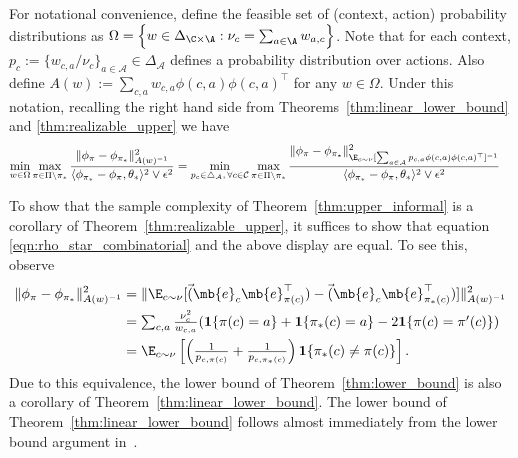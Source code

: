 \documentclass{article}
\newcommand{\mc}[1]{\mathcal{#1}}
\newcommand{\1}{\mathbf{1}}
\begin{document}
For notational convenience, define the feasible set of (context, action) probability distributions as $\Omega = \Big\{ w \in \Delta_{\C \times \A} : \nu_c = \sum_{a \in \A} w_{a,c}  \Big\}$. Note that for each context, $p_{c} := \{w_{c,a}/\nu_c\}_{a\in \mc{A}}\in \Delta_{\mc{A}}$ defines a probability distribution over actions. Also define $A(w) := \sum_{c,a} w_{c,a} \phi(c,a) \phi(c,a)^\top$ for any $w \in \Omega$. 
Under this notation, recalling the right hand side from Theorems~\ref{thm:linear_lower_bound} and \ref{thm:realizable_upper} we have
\begin{align*}
    \min_{w\in \Omega }\max_{\pi \in \Pi \setminus \pi_*} \frac{ \| \phi_\pi - \phi_{\pi_*} \|^2_{A(w)^{-1}} }{\langle \phi_{\pi_*}-\phi_\pi, \theta_*\rangle^2 \vee \epsilon^2} &= \min_{p_c  \in \triangle_{\mc{A}}, \, \forall c \in \mc{C}} \max_{\pi \in \Pi \setminus \pi_*} \frac{ \| \phi_\pi - \phi_{\pi_*} \|^2_{\E_{c \sim \nu}[ \sum_{a \in \mc{A}} p_{c,a} \phi(c,a) \phi(c,a)^{\top} ]^{-1}} }{ \langle \phi_{\pi_*} - \phi_\pi , \theta_* \rangle^2 \vee \epsilon^2 } \label{eqn:rho_star_linear}
\end{align*}

To show that the sample complexity of Theorem~\ref{thm:upper_informal} is a corollary of Theorem~\ref{thm:realizable_upper}, it suffices to show that equation \eqref{eqn:rho_star_combinatorial} and the above display are equal. %
To see this, observe
\begin{align*}
    \| \phi_\pi - \phi_{\pi_*} \|^2_{A(w)^{-1}} &= \| \E_{c\sim\nu}[ \vec(\mb{e}_c \mb{e}_{\pi(c)}^\top) - \vec(\mb{e}_c \mb{e}_{\pi_*(c)}^\top)  ] \|_{A(w)^{-1}}^2 \\
    &= \textstyle\sum_{c,a} \frac{\nu_c^2}{w_{c,a}} (\1\{ \pi(c)=a \} + \1\{ \pi_*(c)=a\} - 2 \1\{ \pi(c)=\pi'(c) \} ) \\
    &= \textstyle\E_{c \sim \nu} \left[ \left(\frac{1}{p_{c,\pi(c)}}+ \frac{1}{p_{c,\pi_*(c)}}\right) \1\{\pi_*(c) \neq \pi(c) \} \right].
\end{align*}
Due to this equivalence, the lower bound of Theorem~\ref{thm:lower_bound} is also a corollary of Theorem~\ref{thm:linear_lower_bound}.
The lower bound of Theorem~\ref{thm:linear_lower_bound} follows almost immediately from the lower bound argument in~\cite{fiez2019sequential}.
\end{document}
